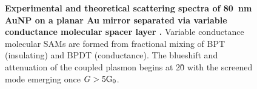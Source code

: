 \documentclass{article}
\begin{document}
\begin{figure}[bt]
\centering
\vspace{-10pt}
\caption[Experimental and theoretical scattering spectra of \SI{80}{nm} AuNP dimers connected via variable conductance molecular linkers \cite{benz2014}]{\textbf{Experimental and theoretical scattering spectra of \SI{80}{nm} AuNP on a planar Au mirror separated via variable conductance molecular spacer layer \cite{benz2014}.} Variable conductance molecular SAMs are formed from fractional mixing of BPT (insulating) and BPDT (conductance). The blueshift and attenuation of the coupled plasmon begins at 2\G0 with the screened mode emerging once $G>5\mathrm{G_{0}}$.}
\label{fig:benz_molecular_npom}
\vspace{-5pt}
\end{figure}
\end{document}
